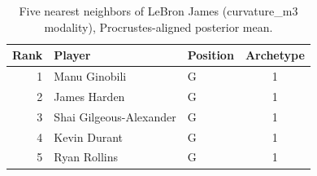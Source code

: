\begin{table}[htbp]
  \centering\small
  \begin{tabular}{rllc}
    \toprule
    Rank & Player & Position & Archetype \\
    \midrule
    1 & Manu Ginobili & G & 1 \\
    2 & James Harden & G & 1 \\
    3 & Shai Gilgeous-Alexander & G & 1 \\
    4 & Kevin Durant & G & 1 \\
    5 & Ryan Rollins & G & 1 \\
    \bottomrule
  \end{tabular}
  \caption{Five nearest neighbors of LeBron James (curvature_m3 modality), Procrustes-aligned posterior mean.}
  \label{tab:LeBron_James_neighbors_curvature_m3}
\end{table}

